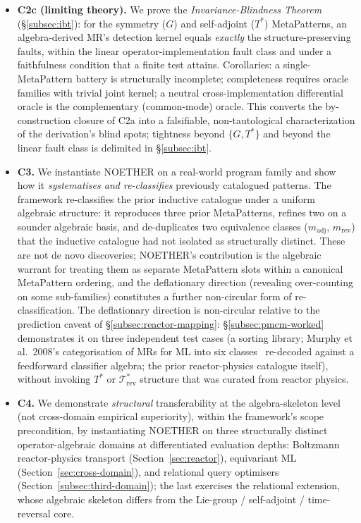 \documentclass[acmsmall,screen,review]{acmart}
\begin{document}
\begin{itemize}
  \item \textbf{C2c (limiting theory).} We prove the \emph{Invariance-Blindness Theorem} (\S\ref{subsec:ibt}): for the symmetry ($G$) and self-adjoint ($T^{*}$) MetaPatterns, an algebra-derived MR's detection kernel equals \emph{exactly} the structure-preserving faults, within the linear operator-implementation fault class and under a faithfulness condition that a finite test attains. Corollaries: a single-MetaPattern battery is structurally incomplete; completeness requires oracle families with trivial joint kernel; a neutral cross-implementation differential oracle is the complementary (common-mode) oracle. This converts the by-construction closure of C2a into a falsifiable, non-tautological characterization of the derivation's blind spots; tightness beyond $\{G, T^{*}\}$ and beyond the linear fault class is delimited in \S\ref{subsec:ibt}.
  \item \textbf{C3.} We instantiate NOETHER on a real-world program family and show how it \emph{systematises and re-classifies} previously catalogued patterns. The framework re-classifies the prior inductive catalogue under a uniform algebraic structure: it reproduces three prior MetaPatterns, refines two on a sounder algebraic basis, and de-duplicates two equivalence classes ($m_{\mathrm{adj}}$, $m_{\mathrm{rev}}$) that the inductive catalogue had not isolated as structurally distinct. These are not de novo discoveries; NOETHER's contribution is the algebraic warrant for treating them as separate MetaPattern slots within a canonical MetaPattern ordering, and the deflationary direction (revealing over-counting on some sub-families) constitutes a further non-circular form of re-classification. The deflationary direction is non-circular relative to the prediction caveat of \S\ref{subsec:reactor-mapping}: \S\ref{subsec:pmcm-worked} demonstrates it on three independent test cases (a sorting library; Murphy et al.\ 2008's categorisation of MRs for ML into six classes~\cite{Murphy2008} re-decoded against a feedforward classifier algebra; the prior reactor-physics catalogue itself), without invoking $T^{*}$ or $\mathcal{T}^{*}_{\mathrm{rev}}$ structure that was curated from reactor physics.
  \item \textbf{C4.} We demonstrate \emph{structural} transferability at the algebra-skeleton level (not cross-domain empirical superiority), within the framework's scope precondition, by instantiating NOETHER on three structurally distinct operator-algebraic domains at differentiated evaluation depths: Boltzmann reactor-physics transport (Section~\ref{sec:reactor}), equivariant ML (Section~\ref{sec:cross-domain}), and relational query optimisers (Section~\ref{subsec:third-domain}); the last exercises the relational extension, whose algebraic skeleton differs from the Lie-group / self-adjoint / time-reversal core.

\end{itemize}
\end{document}
